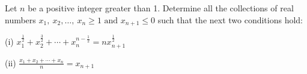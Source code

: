 Let $n$ be a positive integer greater than 1. Determine all the collections of real numbers  $x_1,\ x_2,\dots,\ x_n\geq1\mbox{ and }x_{n+1}\leq0$ such that the next two conditions hold:

(i) $x_1^{\frac12}+x_2^{\frac32}+\cdots+x_n^{n-\frac12}= nx_{n+1}^\frac12$

(ii) $\frac{x_1+x_2+\cdots+x_n}{n}=x_{n+1}$
